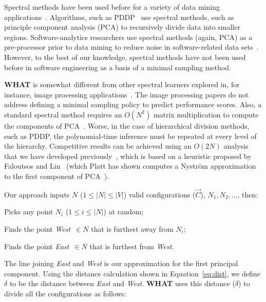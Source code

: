 \documentclass{newsig}
\newcommand{\what}{{\bf WHAT }}
\begin{document}
Spectral methods have been used before for a variety of data mining applications~\cite{kamvar2003spectral}.
Algorithms, such as PDDP~\cite{boley98} use spectral methods, such as principle component analysis (PCA) to
recursively divide data into smaller regions.  Software-analytics researchers use spectral methods (again, PCA) as a pre-processor prior to data mining  to reduce noise in software-related data sets~\cite{Theisen15}.
However, to the best of our knowledge, spectral methods have not been used before in software engineering as a basis of a minimal sampling method.


\what is somewhat different from other spectral
learners explored in, for instance, image processing applications~\cite{shi00}.
The image processing papers do not address
defining a minimal sampling policy to predict performance scores.
Also, a standard spectral method requires an $O(N^2)$ matrix multiplication to compute the components
of PCA~\cite{ilin10}. Worse, in the case of hierarchical division methods, such as PDDP,
the polynomial-time inference must be repeated at every level of the hierarchy.
Competitive results can be achieved
using an $O(2N)$ analysis that we have developed previously~\cite{me12d}, which is  based on  a heuristic proposed by Faloutsos and Lin~\cite{Faloutsos1995} (which Platt has shown computes a Nystr\"om approximation to the first component of PCA~\cite{platt05}).

Our approach inputs $N$ ($1\leq \left\vert{N}\right\vert\leq \left\vert{V}\right\vert$)
valid configurations ($\vec{C}$), $N_1,N_2,...$, then:
\begin{compactenum}
\item
Picks any
point $N_i$ ($1\leq i \leq\left\vert{N}\right\vert$) at random;
\item
Finds
 the point  {\em West}~$\in N$ that is
furthest away from $N_i$;
\item Finds the point {\em East}~$\in N$
that is furthest from {\em West}.
\end{compactenum}
The line joining {\em East}
and {\em West} is our approximation for the first principal component.
Using the distance calculation shown in Equation~\ref{eq:dist}, 
we define $\delta$ to be the distance between {\em East}
and {\em West}. 
\what uses this distance ($\delta$) to divide all the configurations as follows:
\end{document}
